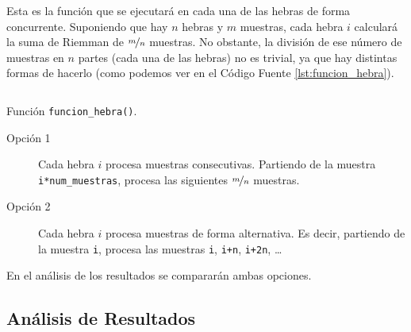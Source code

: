 \documentclass[12pt]{article}
\begin{document}
    Esta es la función que se ejecutará en cada una de las hebras de forma concurrente.
    Suponiendo que hay $n$ hebras y $m$ muestras, cada hebra $i$ calculará la suma de Riemman de $\nicefrac{m}{n}$ muestras.
    No obstante, la división de ese número de muestras en $n$ partes (cada una de las hebras) no es trivial, ya que hay distintas formas de hacerlo
    (como podemos ver en el Código Fuente \ref{lst:funcion_hebra}).
    \begin{listing}
        \inputminted[firstline=62, lastline=82]{c++}{./Programas/S1_Integracion.cpp}
        \caption{Función \texttt{funcion_hebra()}.}
        \label{lst:funcion_hebra}
    \end{listing}
    \begin{description}
        \item[Opción 1] Cada hebra $i$ procesa muestras consecutivas.
        Partiendo de la muestra \texttt{i*num_muestras}, procesa las siguientes $\nicefrac{m}{n}$ muestras.

        \item[Opción 2] Cada hebra $i$ procesa muestras de forma alternativa.
        Es decir, partiendo de la muestra \texttt{i}, procesa las muestras \texttt{i}, \texttt{i+n}, \texttt{i+2n}, \ldots
    \end{description}

    En el análisis de los resultados se compararán ambas opciones.

    \subsection{Análisis de Resultados}


    
\end{document}
